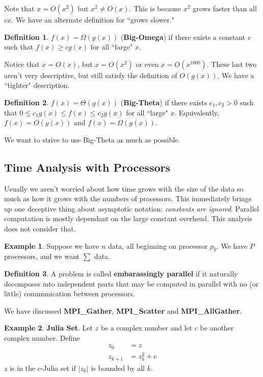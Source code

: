 \documentclass[12pt]{article}
\numberwithin{equation}{section}
\newcommand{\abs}[1]{\lvert#1\rvert} %
\theoremstyle{theorem}
\theoremstyle{definition}
\newtheorem{definition}{Definition}[section]
\newtheorem{example}{Example}[section]
\theoremstyle{remark}
\begin{document}
Note that $x = O(x^2)$ but $x^2 \neq O(x)$.  This is because $x^2$ grows faster than all $cx$.  We have an alternate definition for ``grows slower." 

\begin{definition}
$f(x) = \Omega(g(x))$ (\textbf{Big-Omega}) if there exists a constant $c$ such that $f(x) \geq cg(x)$ for all ``large" $x$. 
\end{definition}

Notice that $x = O(x)$, but $x = O(x^2)$ or even $x = O(x^{1000})$.  These last two aren't very descriptive, but still satisfy the definition of $O(g(x))$.  We have a ``tighter" description.

\begin{definition}
$f(x) = \Theta(g(x))$ (\textbf{Big-Theta}) if there exists $c_1, c_2 > 0$ such that $0 \leq c_1g(x) \leq f(x) \leq c_2g(x)$ for all ``large" $x$.  Equivalently, $f(x) = O(g(x))$ and $f(x) = \Omega(g(x))$.
\end{definition}

We want to strive to use Big-Theta as much as possible. 

\subsection{Time Analysis with Processors}
Usually we aren't worried about how time grows with the size of the data so much as how it grows with the numbers of processors.  This immediately brings up one deceptive thing about asymptotic notation: \textit{constants are ignored}.  Parallel computation is mostly dependant on the large constant overhead.  This analysis does not consider that. 

\begin{example} Suppose we have $n$ data, all beginning on processor $p_0$.  We have $P$ processors, and we want $\sum$ data.\end{example}

\begin{definition} A problem is called \textbf{embarassingly parallel} if it naturally decomposes into independent parts that may be computed in parallel with no (or little) communication between processors. \end{definition}

We have discussed \textbf{MPI\_Gather}, \textbf{MPI\_Scatter} and \textbf{MPI\_AllGather}.

\begin{example} \textbf{Julia Set}.  Let $z$ be a complex number and let $c$ be another complex number.  Define
\begin{align}
z_0 &= z \\
z_{k+1} &= z_k^2 + c
\end{align}
$z$ is in the $c$-Julia set if $\abs{z_k}$ is bounded by all $k$.  
\end{example}
\end{document}
